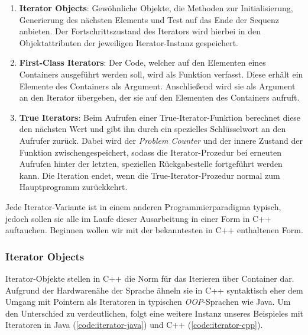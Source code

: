 \documentclass[runningheads]{llncs}
\begin{document}
\begin{enumerate}[1.]
	\label{enum:iterator-types}
	\item \textbf{Iterator Objects}: Gewöhnliche Objekte, die Methoden zur Initialisierung, Generierung des nächsten Elements und Test auf das Ende der Sequenz anbieten.
	      Der Fortschrittszustand des Iterators wird hierbei in den Objektattributen der jeweiligen Iterator-Instanz gespeichert.

	\item \textbf{First-Class Iterators}: Der Code, welcher auf den Elementen eines Containers ausgeführt werden soll, wird als Funktion verfasst.
	      Diese erhält ein Elemente des Containers als Argument.
	      Anschließend wird sie als Argument an den Iterator übergeben, der sie auf den Elementen des Containers aufruft.

	\item \textbf{True Iterators}: Beim Aufrufen einer True-Iterator-Funktion berechnet diese den nächsten Wert und gibt ihn durch ein spezielles Schlüsselwort an den Aufrufer zurück.
	      Dabei wird der \textit{Problem Counter} und der innere Zustand der Funktion zwischengespeichert, sodass die Iterator-Prozedur bei erneuten Aufrufen hinter der letzten, speziellen Rückgabestelle fortgeführt werden kann.
	      Die Iteration endet, wenn die True-Iterator-Prozedur normal zum Hauptprogramm zurückkehrt.
\end{enumerate}

\noindent Jede Iterator-Variante ist in einem anderen Programmierparadigma typisch, jedoch sollen sie alle im Laufe dieser Ausarbeitung in einer Form in C++ auftauchen.
Beginnen wollen wir mit der bekanntesten in C++ enthaltenen Form.

\subsubsection{Iterator Objects}
\label{text:iterator-objects}


Iterator-Objekte stellen in C++ die Norm für das Iterieren über Container dar.
Aufgrund der Hardwarenähe der Sprache ähneln sie in C++ syntaktisch eher dem Umgang mit Pointern als Iteratoren in typischen \textit{OOP}-Sprachen wie Java.
Um den Unterschied zu verdeutlichen, folgt eine weitere Instanz unseres Beispieles mit Iteratoren in Java (\autoref{code:iterator-java}) und C++ (\autoref{code:iterator-cpp}).
\end{document}
